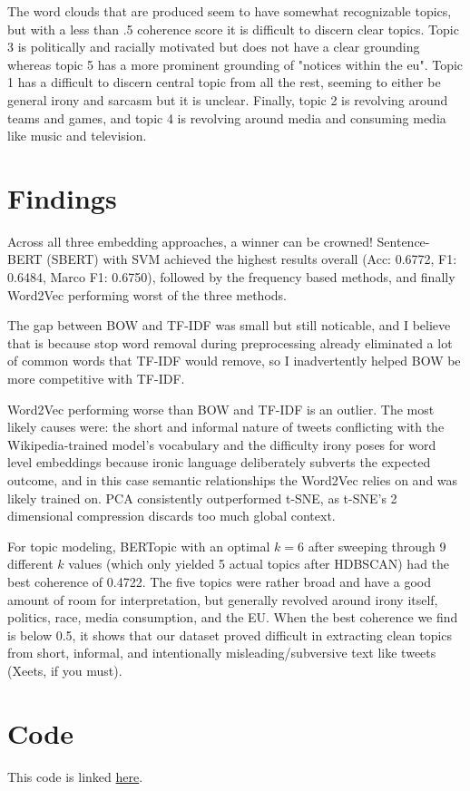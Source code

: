 \documentclass[12pt]{article}
\begin{document}
The word clouds that are produced seem to have somewhat recognizable topics, but with a less than .5 
coherence score it is difficult to discern clear topics. Topic 3 is politically and racially motivated 
but does not have a clear grounding whereas topic 5 has a more prominent grounding of "notices within the eu".
Topic 1 has a difficult to discern central topic from all the rest, seeming to either be general irony and 
sarcasm but it is unclear. Finally, topic 2 is revolving around teams and games, and topic 4 is revolving 
around media and consuming media like music and television. 

\section*{Findings}

Across all three embedding approaches, a winner can be crowned! Sentence-BERT (SBERT) with SVM achieved 
the highest results overall (Acc: 0.6772, F1: 0.6484, Marco F1: 0.6750), followed by the frequency based 
methods, and finally Word2Vec performing worst of the three methods. 

The gap between BOW and TF-IDF was small but still noticable, and I believe that is because stop word 
removal during preprocessing already eliminated a lot of common words that TF-IDF would remove, so I 
inadvertently helped BOW be more competitive with TF-IDF.

Word2Vec performing worse than BOW and TF-IDF is an outlier. The most likely causes were: the short 
and informal nature of tweets conflicting with the Wikipedia-trained model's vocabulary and the 
difficulty irony poses for word level embeddings because ironic language deliberately subverts 
the expected outcome, and in this case semantic relationships the Word2Vec relies on and was likely 
trained on. PCA consistently outperformed t-SNE, as t-SNE's 2 dimensional compression discards too much 
global context.

For topic modeling, BERTopic with an optimal $k = 6$ after sweeping through 9 different $k$ values 
(which only yielded 5 actual topics after HDBSCAN) had the best coherence of 0.4722. The five topics 
were rather broad and have a good amount of room for interpretation, but generally revolved around irony 
itself, politics, race, media consumption, and the EU. When the best coherence we find is below 0.5, it 
shows that our dataset proved difficult in extracting clean topics from short, informal, and intentionally 
misleading/subversive text like tweets (Xeets, if you must).

\section*{Code}

This code is linked \href{https://drive.google.com/file/d/1EARU1KkUAKrpfGEqAsisFIZriJhQWj2b/view?usp=sharing}{here}.


\end{document}
